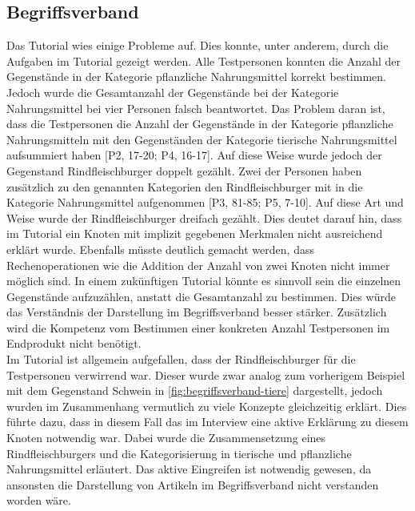 \subsection{Begriffsverband}
Das Tutorial wies einige Probleme auf.
Dies konnte, unter anderem, durch die Aufgaben im Tutorial gezeigt werden.
Alle Testpersonen konnten die Anzahl der Gegenstände in der Kategorie pflanzliche Nahrungsmittel korrekt bestimmen.
Jedoch wurde die Gesamtanzahl der Gegenstände bei der Kategorie Nahrungsmittel bei vier Personen falsch beantwortet.
Das Problem daran ist, dass die Testpersonen die Anzahl der Gegenstände in der Kategorie pflanzliche Nahrungsmitteln mit den Gegenständen der Kategorie tierische Nahrungsmittel aufsummiert haben [P2, 17-20; P4, 16-17].
Auf diese Weise wurde jedoch der Gegenstand Rindfleischburger doppelt gezählt.
Zwei der Personen haben zusätzlich zu den genannten Kategorien den Rindfleischburger mit in die Kategorie Nahrungsmittel aufgenommen [P3, 81-85; P5, 7-10].
Auf diese Art und Weise wurde der Rindfleischburger dreifach gezählt.
Dies deutet darauf hin, dass im Tutorial ein Knoten mit implizit gegebenen Merkmalen nicht ausreichend erklärt wurde.
Ebenfalls müsste deutlich gemacht werden, dass Rechenoperationen wie die Addition der Anzahl von zwei Knoten nicht immer möglich sind.
In einem zukünftigen Tutorial könnte es sinnvoll sein die einzelnen Gegenstände aufzuzählen, anstatt die Gesamtanzahl zu bestimmen.
Dies würde das Verständnis der Darstellung im Begriffsverband besser stärker.
Zusätzlich wird die Kompetenz vom Bestimmen einer konkreten Anzahl Testpersonen im Endprodukt nicht benötigt.\\

Im Tutorial ist allgemein aufgefallen, dass der Rindfleischburger für die Testpersonen verwirrend war.
Dieser wurde zwar analog zum vorherigem Beispiel mit dem Gegenstand Schwein in \autoref{fig:begriffsverband-tiere} dargestellt, jedoch wurden im Zusammenhang vermutlich zu viele Konzepte gleichzeitig erklärt.
Dies führte dazu, dass in diesem Fall das im Interview eine aktive Erklärung zu diesem Knoten notwendig war.
Dabei wurde die Zusammensetzung eines Rindfleischburgers und die Kategorisierung in tierische und pflanzliche Nahrungsmittel erläutert.
Das aktive Eingreifen ist notwendig gewesen, da ansonsten die Darstellung von Artikeln im Begriffsverband nicht verstanden worden wäre.\\

